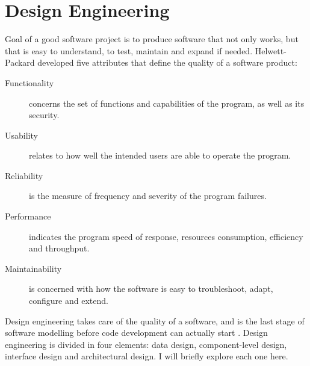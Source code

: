 \section{Design Engineering}
Goal of a good software project is to produce software that not only works, but
that is easy to understand, to test, maintain and expand if needed.
Helwett-Packard developed five attributes \cite{RG87} that define the quality of
a software product:
\begin{description}
\item [Functionality] concerns the set of functions and capabilities of the
program, as well as its security.
\item [Usability] relates to how well the intended users are able to operate the
program.
\item [Reliability] is the measure of frequency and severity of the program
failures.
\item [Performance] indicates the program speed of response, resources
consumption, efficiency and throughput.
\item [Maintainability] is concerned with how the software is easy to
troubleshoot, adapt, configure and extend.
\end{description}

Design engineering takes care of the quality of a software, and is the last
stage of software modelling before code development can actually start
\cite{RP05}.
Design engineering is divided in four elements: data design, component-level design,
interface design and architectural design. I will briefly explore each one
here.

